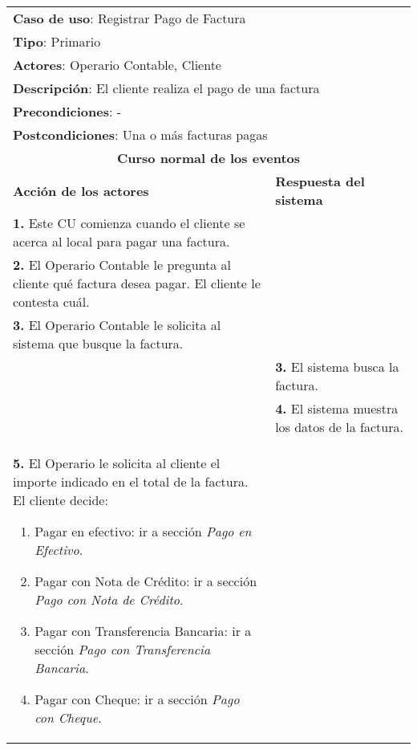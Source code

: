 \documentclass[12pt]{extarticle}
\begin{document}
	\begin{longtable}{ |p{8cm}|p{8cm}| }
		\hline
		\multicolumn{2}{|p{16cm}|}{\textbf{Caso de uso}: Registrar Pago de Factura}\\
		\multicolumn{2}{|p{16cm}|}{\textbf{Tipo}: Primario}\\
		\multicolumn{2}{|p{16cm}|}{\textbf{Actores}: Operario Contable, Cliente}\\
		\multicolumn{2}{|p{16cm}|}{\textbf{Descripción}: El cliente realiza el pago de una factura}\\
		\multicolumn{2}{|p{16cm}|}{\textbf{Precondiciones}: -}\\
		\multicolumn{2}{|p{16cm}|}{\textbf{Postcondiciones}: Una o más facturas pagas}\\
		\hline
		\multicolumn{2}{|c|}{\textbf{Curso normal de los eventos}}\\
		\hline
		\textbf{Acción de los actores} & \textbf{Respuesta del sistema}\\
		\hline
			\textbf{1. }Este CU comienza cuando el cliente se acerca al local para pagar una factura.& \\
            \hline
			\textbf{2. }El Operario Contable le pregunta al cliente qué factura desea pagar. El cliente le contesta cuál. & \\
            \hline
			\textbf{3. }El Operario Contable le solicita al sistema que busque la factura. & \\
            \hline
			& \textbf{3. }El sistema busca la factura. \\
            \hline
			& \textbf{4. }El sistema muestra los datos de la factura. \\
            \hline
			\textbf{5. }El Operario le solicita al cliente el importe indicado en el total de la factura. El cliente decide:
                \begin{enumerate}[label=(\alph*)]
                    \item Pagar en efectivo: ir a sección \textit{Pago en Efectivo}.
                    \item Pagar con Nota de Crédito: ir a sección \textit{Pago con Nota de Crédito}.
                    \item Pagar con Transferencia Bancaria: ir a sección \textit{Pago con Transferencia Bancaria}.
                    \item Pagar con Cheque: ir a sección \textit{Pago con Cheque}.

\end{enumerate}
\end{longtable}
\end{document}
